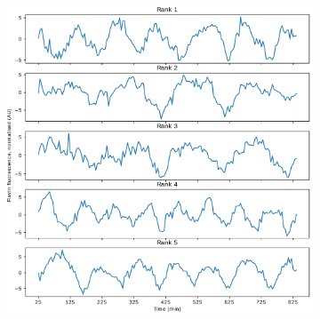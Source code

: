 \begin{figure}[htbp]
  \centering
  \begin{subfigure}[t]{0.65\textwidth}
  \centering
    \includegraphics[width=\linewidth]{glynn_is20016_1_edit.pdf}
    \caption{
    }
    \label{fig:glynn-best-ts}
  \end{subfigure}%
  \begin{subfigure}[t]{0.35\textwidth}
  \centering

\end{subfigure}
\end{figure}

